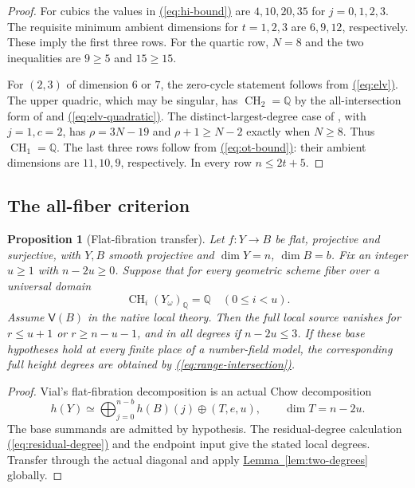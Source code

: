 \documentclass[11pt,a4paper]{article}
\newtheorem{proposition}[theorem]{Proposition}
\theoremstyle{definition}
\theoremstyle{remark}\newtheorem{remark}[theorem]{Remark}
\numberwithin{equation}{section}
\newcommand{\Q}{\mathbb Q}\newcommand{\R}{\mathbb R}\newcommand{\C}{\mathbb C}
\newcommand{\CH}{\operatorname{CH}}\newcommand{\an}{\mathrm{an}}
\newcommand{\lemref}[1]{\hyperref[#1]{\textcolor{resultlink}{Lemma~\ref*{#1}}}}
\renewcommand{\eqref}[1]{\hyperref[#1]{\textcolor{equationlink}{(\ref*{#1})}}}
\begin{document}
\begin{proof}
For cubics the values in \eqref{eq:hi-bound} are
$4,10,20,35$ for $j=0,1,2,3$. The requisite minimum ambient
dimensions for $t=1,2,3$ are $6,9,12$, respectively. These imply
the first three rows. For the quartic row, $N=8$ and the two
inequalities are $9\geq5$ and $15\geq15$.

For $(2,3)$ of dimension $6$ or $7$, the zero-cycle statement
follows from \eqref{eq:elv}. The upper quadric, which may be
singular, has $\CH_2=\Q$ by the all-intersection form of
\cite[Theorem 4.6]{ELV} and \eqref{eq:elv-quadratic}.
The distinct-largest-degree
case of \cite[Theorem 1.5]{HI}, with $j=1,c=2$, has
$\rho=3N-19$ and $\rho+1\geq N-2$ exactly when $N\geq8$.
Thus $\CH_1=\Q$. The last three rows follow from
\eqref{eq:ot-bound}: their ambient dimensions are $11,10,9$,
respectively. In every row $n\leq2t+5$.
\end{proof}

\subsection{The all-fiber criterion}

\begin{proposition}[Flat-fibration transfer]\label{prop:fibration}
Let $f:Y\to B$ be flat, projective and surjective, with $Y,B$
smooth projective and $\dim Y=n$, $\dim B=b$. Fix an integer
$u\geq1$ with $n-2u\geq0$. Suppose that for
every geometric scheme fiber over a universal domain
\[
 \CH_i(Y_\omega)_\Q=\Q\quad(0\leq i<u).
\]
Assume $\mathsf V(B)$ in the native local theory. Then the full
local source vanishes for $r\leq u+1$ or $r\geq n-u-1$, and in
all degrees if $n-2u\leq3$. If these base hypotheses hold at every
finite place of a number-field model, the corresponding full
height degrees are obtained by \eqref{eq:range-intersection}.
\end{proposition}

\begin{proof}
Vial's flat-fibration decomposition \cite[Theorem 4.2]{VialFibrations}
is an actual Chow decomposition
\begin{equation}\label{eq:fibration-motive}
 h(Y)\simeq\bigoplus_{j=0}^{n-b}h(B)(j)\oplus(T,e,u),
 \qquad\dim T=n-2u.
\end{equation}
The base summands are admitted by hypothesis. The residual-degree
calculation \eqref{eq:residual-degree} and the endpoint input give
the stated local degrees. Transfer through the actual diagonal
and apply \lemref{lem:two-degrees} globally.
\end{proof}
\end{document}
